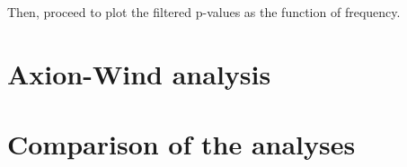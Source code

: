 Then, proceed to plot the filtered p-values as the function of frequency.


\section{Axion-Wind analysis}

\section{Comparison of the analyses}
